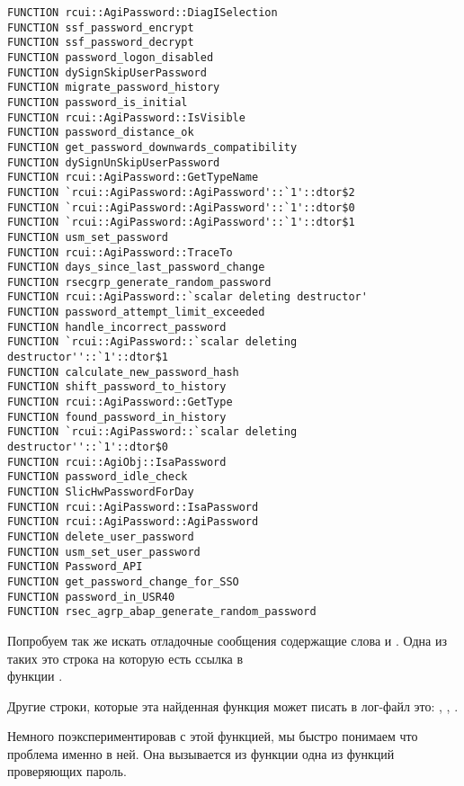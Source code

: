 \begin{lstlisting}
FUNCTION rcui::AgiPassword::DiagISelection 
FUNCTION ssf_password_encrypt 
FUNCTION ssf_password_decrypt 
FUNCTION password_logon_disabled 
FUNCTION dySignSkipUserPassword 
FUNCTION migrate_password_history 
FUNCTION password_is_initial 
FUNCTION rcui::AgiPassword::IsVisible 
FUNCTION password_distance_ok 
FUNCTION get_password_downwards_compatibility 
FUNCTION dySignUnSkipUserPassword 
FUNCTION rcui::AgiPassword::GetTypeName 
FUNCTION `rcui::AgiPassword::AgiPassword'::`1'::dtor$2 
FUNCTION `rcui::AgiPassword::AgiPassword'::`1'::dtor$0 
FUNCTION `rcui::AgiPassword::AgiPassword'::`1'::dtor$1 
FUNCTION usm_set_password 
FUNCTION rcui::AgiPassword::TraceTo 
FUNCTION days_since_last_password_change 
FUNCTION rsecgrp_generate_random_password 
FUNCTION rcui::AgiPassword::`scalar deleting destructor' 
FUNCTION password_attempt_limit_exceeded 
FUNCTION handle_incorrect_password 
FUNCTION `rcui::AgiPassword::`scalar deleting destructor''::`1'::dtor$1 
FUNCTION calculate_new_password_hash 
FUNCTION shift_password_to_history 
FUNCTION rcui::AgiPassword::GetType 
FUNCTION found_password_in_history 
FUNCTION `rcui::AgiPassword::`scalar deleting destructor''::`1'::dtor$0 
FUNCTION rcui::AgiObj::IsaPassword 
FUNCTION password_idle_check 
FUNCTION SlicHwPasswordForDay 
FUNCTION rcui::AgiPassword::IsaPassword 
FUNCTION rcui::AgiPassword::AgiPassword 
FUNCTION delete_user_password 
FUNCTION usm_set_user_password 
FUNCTION Password_API 
FUNCTION get_password_change_for_SSO 
FUNCTION password_in_USR40 
FUNCTION rsec_agrp_abap_generate_random_password 
\end{lstlisting}

Попробуем так же искать отладочные сообщения содержащие слова  и .
Одна из таких это строка  на которую есть ссылка в \\
функции .

Другие строки, которые эта найденная функция может писать в лог-файл это: 
, , .

Немного поэкспериментировав с этой функцией, мы быстро понимаем что проблема именно в ней.
Она вызывается из функции \EMDASH{}одна из функций проверяющих пароль.

